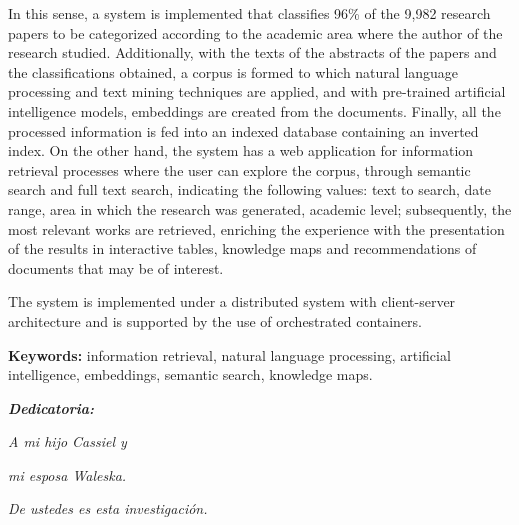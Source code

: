 In this sense, a system is implemented that classifies 96\% of the 9,982 research papers to be categorized according to the academic area where the author of the research studied. Additionally, with the texts of the abstracts of the papers and the classifications obtained, a corpus is formed to which natural language processing and text mining techniques are applied, and with pre-trained artificial intelligence models, embeddings are created from the documents. Finally, all the processed information is fed into an indexed database containing an inverted index.
On the other hand, the system has a web application for information retrieval processes where the user can explore the corpus, through semantic search and full text search, indicating the following values: text to search, date range, area in which the research was generated, academic level; subsequently, the most relevant works are retrieved, enriching the experience with the presentation of the results in interactive tables, knowledge maps and recommendations of documents that may be of interest.

The system is implemented under a distributed system with client-server architecture and is supported by the use of orchestrated containers.


\vspace*{2cm}

\textbf{Keywords:} information retrieval, natural language processing,  artificial intelligence, embeddings, semantic search, knowledge maps.

\thispagestyle{empty}




\setlength{\abovedisplayskip}{-5pt}
\setlength{\abovedisplayshortskip}{-5pt}
\thispagestyle{empty}

\newpage
\begin{center}
\large{\textbf{\emph{\Huge{Dedicatoria:}}}}
\end{center}
\thispagestyle{empty}
\vspace*{5cm}
\thispagestyle{empty}
\begin{center} \Large \emph{A mi hijo Cassiel y  } \end{center}
\vspace*{1cm}
\begin{center} \Large \emph{mi esposa Waleska.} \end{center}
\vspace*{1cm}
\begin{center} \Large {\emph{De ustedes es esta investigación.}} \end{center}



